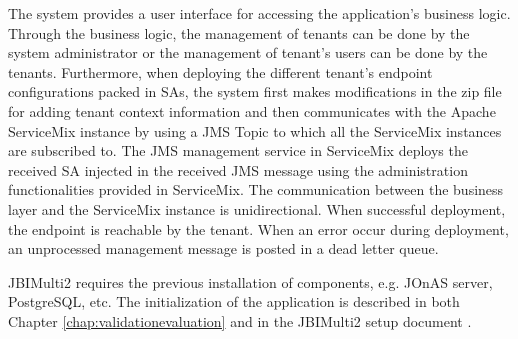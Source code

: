 The system provides a user interface for accessing the application's business logic. Through the business logic, the management of tenants can be done by the system administrator or the management of tenant's users can be done by the tenants. Furthermore, when deploying the different tenant's endpoint configurations packed in \ac{SA}s, the system first makes modifications in the zip file for adding tenant context information and then communicates with the Apache ServiceMix instance by using a \ac{JMS} Topic to which all the ServiceMix instances are subscribed to. The \ac{JMS} management service in ServiceMix deploys the received \ac{SA} injected in the received \ac{JMS} message using the administration functionalities provided in ServiceMix. The communication between the business layer and the ServiceMix instance is unidirectional. When successful deployment, the endpoint is reachable by the tenant. When an error occur during deployment, an unprocessed management message is posted in a dead letter queue.

JBIMulti2 requires the previous installation of components, e.g. JOnAS server, PostgreSQL, etc. The initialization of the application is described in both Chapter \ref{chap:validationevaluation} and in the JBIMulti2 setup document \cite{JBIMulti2Man}.